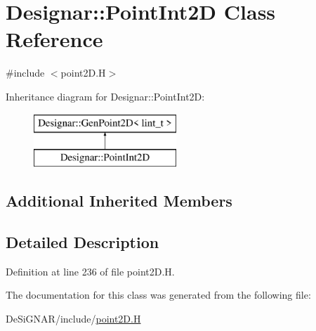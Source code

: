 \hypertarget{class_designar_1_1_point_int2_d}{}\section{Designar\+:\+:Point\+Int2D Class Reference}
\label{class_designar_1_1_point_int2_d}


{\ttfamily \#include $<$point2\+D.\+H$>$}

Inheritance diagram for Designar\+:\+:Point\+Int2D\+:\begin{figure}[H]
\begin{center}
\leavevmode
\includegraphics[height=2.000000cm]{class_designar_1_1_point_int2_d}
\end{center}
\end{figure}
\subsection*{Additional Inherited Members}


\subsection{Detailed Description}


Definition at line 236 of file point2\+D.\+H.



The documentation for this class was generated from the following file\+:\begin{DoxyCompactItemize}
\item 
De\+Si\+G\+N\+A\+R/include/\hyperlink{point2_d_8_h}{point2\+D.\+H}\end{DoxyCompactItemize}
